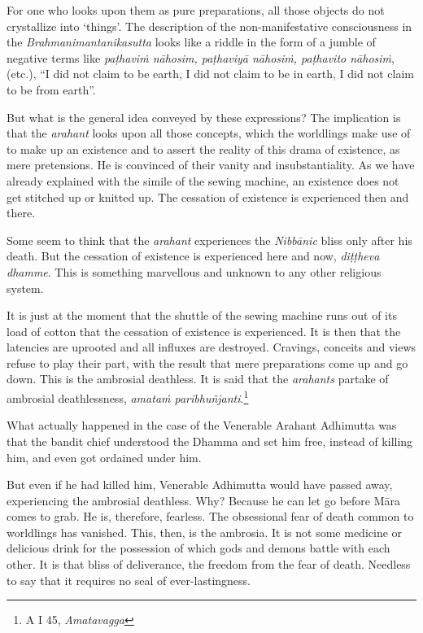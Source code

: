 For one who looks upon them as pure preparations, all those objects do not crystallize into `things'. The description of the non-manifestative consciousness in the \emph{Brahmanimantanikasutta} looks like a riddle in the form of a jumble of negative terms like \emph{paṭhaviṁ nāhosim, paṭhaviyā nāhosiṁ, paṭhavito nāhosiṁ}, (etc.), ``I did not claim to be earth, I did not claim to be in earth, I did not claim to be from earth''.

But what is the general idea conveyed by these expressions? The implication is that the \emph{arahant} looks upon all those concepts, which the worldlings make use of to make up an existence and to assert the reality of this drama of existence, as mere pretensions. He is convinced of their vanity and insubstantiality. As we have already explained with the simile of the sewing machine, an existence does not get stitched up or knitted up. The cessation of existence is experienced then and there.

Some seem to think that the \emph{arahant} experiences the \emph{Nibbānic} bliss only after his death. But the cessation of existence is experienced here and now, \emph{diṭṭheva dhamme}. This is something marvellous and unknown to any other religious system.

It is just at the moment that the shuttle of the sewing machine runs out of its load of cotton that the cessation of existence is experienced. It is then that the latencies are uprooted and all influxes are destroyed. Cravings, conceits and views refuse to play their part, with the result that mere preparations come up and go down. This is the ambrosial deathless. It is said that the \emph{arahants} partake of ambrosial deathlessness, \emph{amataṁ paribhuñjanti}.\footnote{A I 45, \emph{Amatavagga}}

What actually happened in the case of the Venerable Arahant Adhimutta was that the bandit chief understood the Dhamma and set him free, instead of killing him, and even got ordained under him.

But even if he had killed him, Venerable Adhimutta would have passed away, experiencing the ambrosial deathless. Why? Because he can let go before Māra comes to grab. He is, therefore, fearless. The obsessional fear of death common to worldlings has vanished. This, then, is the ambrosia. It is not some medicine or delicious drink for the possession of which gods and demons battle with each other. It is that bliss of deliverance, the freedom from the fear of death. Needless to say that it requires no seal of ever-lastingness.

